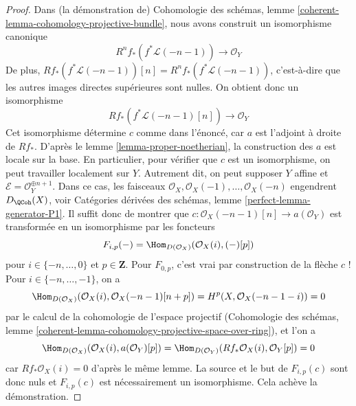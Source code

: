 \begin{proof}
Dans (la démonstration de) Cohomologie des schémas, lemme \ref{coherent-lemma-cohomology-projective-bundle}, nous avons construit un isomorphisme canonique
$$
R^nf_*(f^*\mathcal{L}(-n - 1)) \longrightarrow \mathcal{O}_Y
$$
De plus, $Rf_*(f^*\mathcal{L}(-n - 1))[n] = R^nf_*(f^*\mathcal{L}(-n - 1))$, c'est-à-dire que les autres images directes supérieures sont nulles. On obtient donc un isomorphisme
$$
Rf_*(f^*\mathcal{L}(-n - 1)[n]) \longrightarrow \mathcal{O}_Y
$$
Cet isomorphisme détermine $c$ comme dans l'énoncé, car $a$ est l'adjoint à droite de $Rf_*$. D'après le lemme \ref{lemma-proper-noetherian}, la construction des $a$ est locale sur la base. En particulier, pour vérifier que $c$ est un isomorphisme, on peut travailler localement sur $Y$. Autrement dit, on peut supposer $Y$ affine et $\mathcal{E} = \mathcal{O}_Y^{\oplus n + 1}$. Dans ce cas, les faisceaux $\mathcal{O}_X, \mathcal{O}_X(-1), \ldots,
\mathcal{O}_X(-n)$ engendrent $D_\QCoh(X)$, voir Catégories dérivées des schémas, lemme \ref{perfect-lemma-generator-P1}. Il suffit donc de montrer que
$c : \mathcal{O}_X(-n - 1)[n] \to a(\mathcal{O}_Y)$
est transformée en un isomorphisme par les foncteurs
$$
F_{i, p}(-) = \Hom_{D(\mathcal{O}_X)}(\mathcal{O}_X(i), (-)[p])
$$
pour $i \in \{-n, \ldots, 0\}$ et $p \in \mathbf{Z}$. Pour $F_{0, p}$, c'est vrai par construction de la flèche $c$ ! Pour $i \in \{-n, \ldots, -1\}$, on a
$$
\Hom_{D(\mathcal{O}_X)}(\mathcal{O}_X(i), \mathcal{O}_X(-n - 1)[n + p]) =
H^p(X, \mathcal{O}_X(-n - 1 - i)) = 0
$$
par le calcul de la cohomologie de l'espace projectif (Cohomologie des schémas, lemme \ref{coherent-lemma-cohomology-projective-space-over-ring}), et l'on a
$$
\Hom_{D(\mathcal{O}_X)}(\mathcal{O}_X(i), a(\mathcal{O}_Y)[p]) =
\Hom_{D(\mathcal{O}_Y)}(Rf_*\mathcal{O}_X(i), \mathcal{O}_Y[p]) = 0
$$
car $Rf_*\mathcal{O}_X(i) = 0$ d'après le même lemme. La source et le but de $F_{i, p}(c)$ sont donc nuls et $F_{i, p}(c)$ est nécessairement un isomorphisme. Cela achève la démonstration.
\end{proof}

